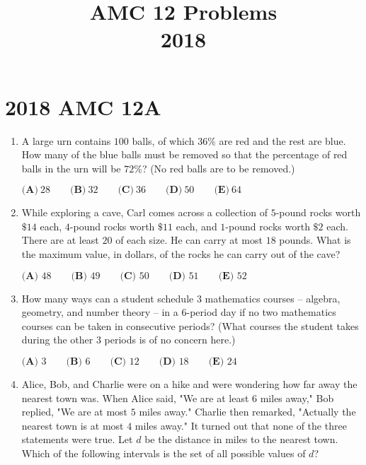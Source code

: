\documentclass{article}
\title{AMC 12 Problems \\ 2018}
\date{}
\begin{document}
\maketitle\thispagestyle{fancy}\newpage\section*{2018 AMC 12A}
\begin{enumerate}[label=\arabic*., itemsep=0.5em]
\item A large urn contains \(100\) balls, of which \(36 \%\) are red and the rest are blue. How many of the blue balls must be removed so that the percentage of red balls in the urn will be \(72 \%\)? (No red balls are to be removed.)

\( \textbf{(A)}\ 28 \qquad\textbf{(B)}\  32 \qquad\textbf{(C)}\  36 \qquad\textbf{(D)}\ 
 50 \qquad\textbf{(E)}\ 64 \)\par \vspace{0.5em}\item While exploring a cave, Carl comes across a collection of \(5\)-pound rocks worth \(\$14\) each, \(4\)-pound rocks worth \(\$11\) each, and \(1\)-pound rocks worth \(\$2\) each. There are at least \(20\) of each size. He can carry at most \(18\) pounds. What is the maximum value, in dollars, of the rocks he can carry out of the cave?

\(\textbf{(A) } 48 \qquad \textbf{(B) } 49 \qquad \textbf{(C) } 50 \qquad \textbf{(D) } 51 \qquad \textbf{(E) } 52 \)\par \vspace{0.5em}\item How many ways can a student schedule \(3\) mathematics courses -- algebra, geometry, and number theory -- in a \(6\)-period day if no two mathematics courses can be taken in consecutive periods? (What courses the student takes during the other \(3\) periods is of no concern here.)

\(\textbf{(A) }3\qquad\textbf{(B) }6\qquad\textbf{(C) }12\qquad\textbf{(D) }18\qquad\textbf{(E) }24\)\par \vspace{0.5em}\item Alice, Bob, and Charlie were on a hike and were wondering how far away the nearest town was. When Alice said, "We are at least \(6\) miles away," Bob replied, "We are at most \(5\) miles away." Charlie then remarked, "Actually the nearest town is at most \(4\) miles away." It turned out that none of the three statements were true. Let \(d\) be the distance in miles to the nearest town. Which of the following intervals is the set of all possible values of \(d\)?


\end{enumerate}
\end{document}
